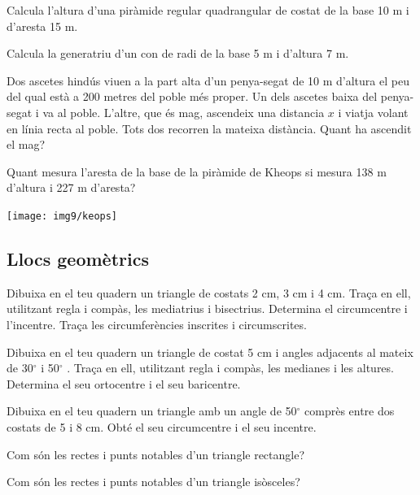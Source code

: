\begin{activitats}
\begin{mylist}
\exer  Calcula l'altura d'una piràmide regular quadrangular de costat de la base 10 m i d'aresta 15 m.

\exer  Calcula la generatriu d'un con de radi de la base 5 m i d'altura 7 m.

\exer  Dos ascetes hindús viuen a la part alta d'un penya-segat de 10 m d'altura el peu del qual està a 200 metres del poble més proper. Un dels ascetes baixa del penya-segat i va al poble. L'altre, que és mag, ascendeix una distancia $x$ i viatja volant en línia recta al poble. Tots dos recorren la mateixa distància. Quant ha ascendit el mag?

\exer  Quant mesura l'aresta de la base de la piràmide de Kheops si mesura 138 m d'altura i 227 m d'aresta?
\begin{center}
	\texttt{[image: img9/keops]}
\end{center}

\end{mylist}


\subsection{Llocs geomètrics}

\begin{mylist}
	\exer  Dibuixa en el teu quadern un triangle de costats 2 cm, 3 cm i 4 cm. Traça en ell, utilitzant regla i compàs, les mediatrius i bisectrius. Determina el circumcentre i l'incentre. Traça les circumferències inscrites i circumscrites.
	
	\exer  Dibuixa en el teu quadern un triangle de costat 5 cm i angles adjacents al mateix de 30${}^\circ$  i 50${}^\circ$ . Traça en ell, utilitzant regla i compàs, les medianes i les altures. Determina el seu ortocentre i el seu baricentre.
	
	\exer  Dibuixa en el teu quadern un triangle amb un angle de 50${}^\circ$  comprès entre dos costats de 5 i 8 cm. Obté el seu circumcentre i el seu incentre.
	
	\exer  Com són les rectes i punts notables d'un triangle rectangle?
	
	\exer  Com són les rectes i punts notables d'un triangle isòsceles?


\end{mylist}
\end{activitats}

